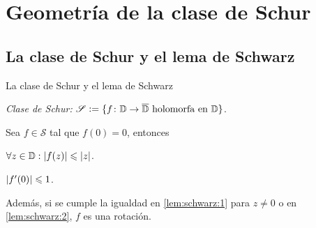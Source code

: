 \documentclass[
    aspectratio=169,
]{beamer}
\begin{document}
\section{Geometría de la clase de Schur}

\subsection{La clase de Schur y el lema de Schwarz}

\begin{frame}{La clase de Schur y el lema de Schwarz}

    \emph{Clase de Schur:} $\mathscr{S} \vcentcolon= \{f \colon \mathbb{D} \to \overline{\mathbb{D}} \text{ holomorfa en } \mathbb{D} \}$.
    
    \vspace{2em}

    \pause

    \begin{lem}[de Schwarz]%
        Sea $f \in \mathscr{S}$ tal que $f(0) = 0$, entonces
        \begin{enu}[2][label=\textnormal{(\arabic*)}, ref=\textnormal{(\arabic*)}]
            \item $\forall z \in \mathbb{D} : \left|f(z)\right| \leqslant \left|z\right|$. \label{lem:schwarz:1}
            \item $\left|f'(0)\right| \leqslant 1$. \label{lem:schwarz:2}
        \end{enu}

        Además, si se cumple la igualdad en \ref{lem:schwarz:1} para $z \neq 0$ o en \ref{lem:schwarz:2}, $f$ es una rotación.
    \end{lem}


\end{frame}
\end{document}
